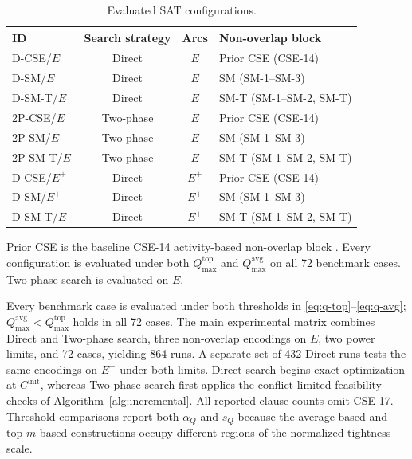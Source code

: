 \documentclass[]{interact}
\theoremstyle{plain}
\theoremstyle{definition}
\theoremstyle{remark}
\newcommand{\Cinit}{C^{\mathrm{init}}}
\begin{document}
\begin{table}[t!]
\centering
\caption{Evaluated SAT configurations.}
\label{tab:sat-configurations}
\footnotesize
\renewcommand{\arraystretch}{1.15}
\setlength{\tabcolsep}{14pt}
\begin{threeparttable}
\begin{tabular}{@{} l c c l @{}}
\toprule
ID & Search strategy & Arcs & Non-overlap block \\
\midrule
D-CSE/$E$ & Direct & $E$ & Prior CSE (CSE-14) \\
D-SM/$E$ & Direct & $E$ & SM (SM-1--SM-3) \\
D-SM-T/$E$ & Direct & $E$ & SM-T (SM-1--SM-2, SM-T) \\
\addlinespace[2pt]
2P-CSE/$E$ & Two-phase & $E$ & Prior CSE (CSE-14) \\
2P-SM/$E$ & Two-phase & $E$ & SM (SM-1--SM-3) \\
2P-SM-T/$E$ & Two-phase & $E$ & SM-T (SM-1--SM-2, SM-T) \\
\addlinespace[2pt]
D-CSE/$E^+$ & Direct & $E^+$ & Prior CSE (CSE-14) \\
D-SM/$E^+$ & Direct & $E^+$ & SM (SM-1--SM-3) \\
D-SM-T/$E^+$ & Direct & $E^+$ & SM-T (SM-1--SM-2, SM-T) \\
\bottomrule
\end{tabular}
\begin{tablenotes}[flushleft]
\scriptsize
\item Prior CSE is the baseline CSE-14 activity-based non-overlap block \citep{VanKieu2025Compact}. Every configuration is evaluated under both $Q^{\mathrm{top}}_{\max}$ and $Q^{\mathrm{avg}}_{\max}$ on all 72 benchmark cases. Two-phase search is evaluated on $E$.
\end{tablenotes}
\end{threeparttable}
\end{table}

Every benchmark case is evaluated under both thresholds in \eqref{eq:q-top}--\eqref{eq:q-avg}; $Q_{\max}^{\mathrm{avg}}<Q_{\max}^{\mathrm{top}}$ holds in all 72 cases. The main experimental matrix combines Direct and Two-phase search, three non-overlap encodings on $E$, two power limits, and 72 cases, yielding 864 runs. A separate set of 432 Direct runs tests the same encodings on $E^+$ under both limits. Direct search begins exact optimization at $\Cinit$, whereas Two-phase search first applies the conflict-limited feasibility checks of Algorithm~\ref{alg:incremental}. All reported clause counts omit CSE-17. Threshold comparisons report both $\alpha_Q$ and $s_Q$ because the average-based and top-$m$-based constructions occupy different regions of the normalized tightness scale.
\end{document}

